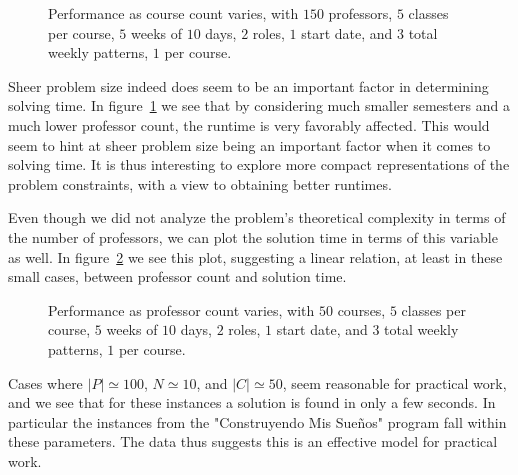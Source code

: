 \begin{figure}
  \begin{center}
    \caption{Performance as course count varies, with $150$ professors, $5$ classes per course, $5$ weeks of $10$ days, $2$ roles, $1$ start date, and $3$ total weekly patterns, $1$ per course.}
    \label{bench:megacourses2}
  \end{center}
\end{figure}

Sheer problem size indeed does seem to be an important factor in determining solving time. In figure~\ref{bench:megacourses2} we see that by considering much smaller semesters and a much lower professor count, the runtime is very favorably affected. This would seem to hint at sheer problem size being an important factor when it comes to solving time. It is thus interesting to explore more compact representations of the problem constraints, with a view to obtaining better runtimes.

Even though we did not analyze the problem's theoretical complexity in terms of the number of professors, we can plot the solution time in terms of this variable as well. In figure~\ref{bench:profs} we see this plot, suggesting a linear relation, at least in these small cases, between professor count and solution time.

\begin{figure}
  \begin{center}
    \caption{Performance as professor count varies, with $50$ courses, $5$ classes per course, $5$ weeks of $10$ days, $2$ roles, $1$ start date, and $3$ total weekly patterns, $1$ per course.}
    \label{bench:profs}
  \end{center}
\end{figure}

Cases where $|P| \simeq 100$, $N \simeq 10$, and $|C| \simeq 50$, seem reasonable for practical work, and we see that for these instances a solution is found in only a few seconds. In particular the instances from the "Construyendo Mis Sueños" program fall within these parameters. The data thus suggests this is an effective model for practical work.


